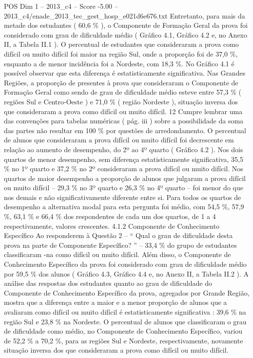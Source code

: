 \begin{textsample}{POS Dim 1 – 2013\_c4 – Score -5.00 – 2013\_c4/enade\_2013\_tec\_gest\_hosp\_e021d6e676.txt}
Entretanto, para mais da metade dos estudantes ( 60,6 \% ), o Componente de Formação Geral da prova foi considerado com grau de dificuldade médio ( Gráfico 4.1, Gráfico 4.2 e, no Anexo II, a Tabela II.1 ).
O percentual de estudantes que consideraram a prova como difícil ou muito difícil foi maior na região Sul, onde a proporção foi de 37,0 \%, enquanto a de menor incidência foi a Nordeste, com 18,3 \%.
No Gráfico 4.1 é possível observar que esta diferença é estatisticamente significativa.
Nas Grandes Regiões, a proporção de presentes à prova que consideraram o Componente de Formação Geral como sendo de grau de dificuldade médio esteve entre 57,3 \% ( regiões Sul e Centro-Oeste ) e 71,0 \% ( região Nordeste ), situação inversa dos que consideraram a prova como difícil ou muito difícil. 12 Cumpre lembrar uma das convenções para tabelas numéricas ( pág. iii ) sobre a possibilidade da soma das partes não resultar em 100 \% por questões de arredondamento.
O percentual de alunos que consideraram a prova difícil ou muito difícil foi decrescente em relação ao aumento de desempenho, do 2º ao 4º quarto ( Gráfico 4.2 ).
Nos dois quartos de menor desempenho, sem diferença estatisticamente significativa, 35,5 \% no 1º quarto e 37,2 \% no 2º consideraram a prova difícil ou muito difícil.
Nos quartos de maior desempenho a proporção de alunos que julgaram a prova difícil ou muito difícil – 29,3 \% no 3º quarto e 26,3 \% no 4º quarto – foi menor do que nos demais e não significativamente diferente entre si.
Para todos os quartos de desempenho a alternativa modal para esta pergunta foi médio, com 54,5 \%, 57,9 \%, 63,1 \% e 66,4 \% dos respondentes de cada um dos quartos, de 1 a 4 respectivamente, valores crescentes. 4.1.2 Componente de Conhecimento Específico Ao responderem à Questão 2 – “ Qual o grau de dificuldade desta prova na parte de Componente Específico? ” – 33,4 \% do grupo de estudantes classificaram -na como difícil ou muito difícil.
Além disso, o Componente de Conhecimento Específico da prova foi considerado com grau de dificuldade médio por 59,5 \% dos alunos ( Gráfico 4.3, Gráfico 4.4 e, no Anexo II, a Tabela II.2 ).
A análise das respostas dos estudantes quanto ao grau de dificuldade do Componente de Conhecimento Específico da prova, agregados por Grande Região, mostra que a diferença entre a maior e a menor proporção de alunos que a avaliaram como difícil ou muito difícil é estatisticamente significativa : 39,6 \% na região Sul e 23,8 \% na Nordeste.
O percentual de alunos que classificaram o grau de dificuldade como médio, no Componente de Conhecimento Específico, variou de 52,2 \% a 70,2 \%, para as regiões Sul e Nordeste, respectivamente, novamente situação inversa dos que consideraram a prova como difícil ou muito difícil.

\end{textsample}
